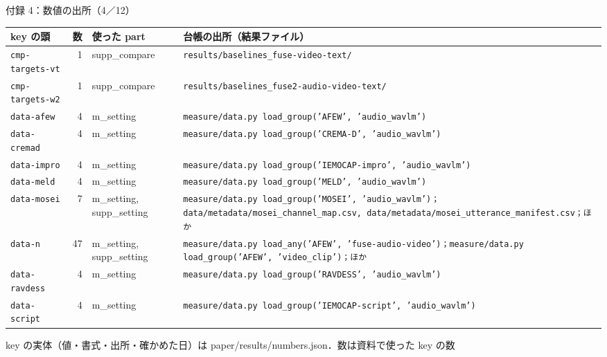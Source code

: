 \begin{frame}{付録 4：数値の出所（4／12）}
  \vspace{-0.3em}\centering\tiny\renewcommand{\arraystretch}{1.0}
  \begin{tabularx}{\textwidth}{@{}l r l X@{}}
    \toprule key の頭 & 数 & 使った part & 台帳の出所（結果ファイル） \\ \midrule
    \texttt{cmp-targets-vt} & 1 & supp\_compare & \texttt{results/\allowbreak{}baselines\_\allowbreak{}fuse-video-text/\allowbreak{}} \\
    \texttt{cmp-targets-w2} & 1 & supp\_compare & \texttt{results/\allowbreak{}baselines\_\allowbreak{}fuse2-audio-video-text/\allowbreak{}} \\
    \texttt{data-afew} & 4 & m\_setting & \texttt{measure/\allowbreak{}data.py load\_\allowbreak{}group('AFEW', 'audio\_\allowbreak{}wavlm')} \\
    \texttt{data-cremad} & 4 & m\_setting & \texttt{measure/\allowbreak{}data.py load\_\allowbreak{}group('CREMA-D', 'audio\_\allowbreak{}wavlm')} \\
    \texttt{data-impro} & 4 & m\_setting & \texttt{measure/\allowbreak{}data.py load\_\allowbreak{}group('IEMOCAP-impro', 'audio\_\allowbreak{}wavlm')} \\
    \texttt{data-meld} & 4 & m\_setting & \texttt{measure/\allowbreak{}data.py load\_\allowbreak{}group('MELD', 'audio\_\allowbreak{}wavlm')} \\
    \texttt{data-mosei} & 7 & m\_setting, supp\_setting & \texttt{measure/\allowbreak{}data.py load\_\allowbreak{}group('MOSEI', 'audio\_\allowbreak{}wavlm')；data/\allowbreak{}metadata/\allowbreak{}mosei\_\allowbreak{}channel\_\allowbreak{}map.csv, data/\allowbreak{}metadata/\allowbreak{}mosei\_\allowbreak{}utterance\_\allowbreak{}manifest.csv；ほか} \\
    \texttt{data-n} & 47 & m\_setting, supp\_setting & \texttt{measure/\allowbreak{}data.py load\_\allowbreak{}any('AFEW', 'fuse-audio-video')；measure/\allowbreak{}data.py load\_\allowbreak{}group('AFEW', 'video\_\allowbreak{}clip')；ほか} \\
    \texttt{data-ravdess} & 4 & m\_setting & \texttt{measure/\allowbreak{}data.py load\_\allowbreak{}group('RAVDESS', 'audio\_\allowbreak{}wavlm')} \\
    \texttt{data-script} & 4 & m\_setting & \texttt{measure/\allowbreak{}data.py load\_\allowbreak{}group('IEMOCAP-script', 'audio\_\allowbreak{}wavlm')} \\
    \bottomrule
  \end{tabularx}\par
  {\raggedright\tiny key の実体（値・書式・出所・確かめた日）は paper/results/numbers.json．数は資料で使った key の数\par}
\end{frame}

